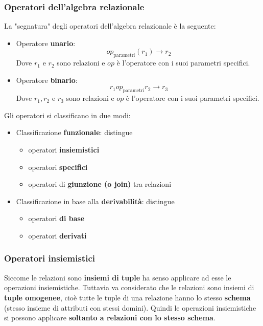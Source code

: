 \documentclass[a4paper,twoside]{article}
\begin{document}
\subsubsection{Operatori dell'algebra relazionale}
La "segnatura" degli operatori dell'algebra relazionale è la seguente:
\begin{itemize}
  \item Operatore \textbf{unario}:
    \[
      op_{\text{parametri}}(r_1) \to r_2
    \] 
    Dove \( r_1 \) e \( r_2 \) sono relazioni e \( op \) è l'operatore con i suoi
    parametri specifici.

  \item Operatore \textbf{binario}:
    \[
      r_1 op_{\text{parametri}} r_2 \to r_3
    \]
    Dove \( r_1, r_2 \) e \( r_3 \) sono relazioni e \( op \) è l'operatore con i suoi
    parametri specifici.
\end{itemize}
Gli operatori si classificano in due modi:
\begin{itemize}
  \item Classificazione \textbf{funzionale}: distingue
    \begin{itemize}
      \item operatori \textbf{insiemistici}
      \item operatori \textbf{specifici}
      \item operatori di \textbf{giunzione (o join)} tra relazioni
    \end{itemize}

  \item Classificazione in base alla \textbf{derivabilità}: distingue
    \begin{itemize}
      \item operatori \textbf{di base}
      \item operatori \textbf{derivati}
    \end{itemize}
\end{itemize}

\subsubsection{Operatori insiemistici}
Siccome le relazioni sono \textbf{insiemi di tuple} ha senso applicare ad esse
le operazioni insiemistiche. Tuttavia va considerato che le relazioni sono insiemi
di \textbf{tuple omogenee}, cioè tutte le tuple di una relazione hanno lo stesso
\textbf{schema} (stesso insieme di attributi con stessi domini).
Quindi le operazioni insiemistiche si possono applicare
\textbf{soltanto a relazioni con lo stesso schema}.
\end{document}
